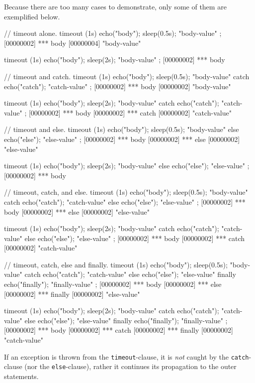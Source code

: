 Because there are too many cases to demonstrate, only some of them are
exemplified below.
\begin{urbiscript}
// timeout alone.
timeout (1s)  { echo("body"); sleep(0.5s); "body-value" };
[00000002] *** body
[00000004] "body-value"

timeout (1s)  { echo("body"); sleep(2s); "body-value" };
[00000002] *** body

// timeout and catch.
timeout (1s)  { echo("body"); sleep(0.5s); "body-value" }
catch         { echo("catch"); "catch-value" };
[00000002] *** body
[00000002] "body-value"

timeout (1s)  { echo("body"); sleep(2s); "body-value" }
catch         { echo("catch"); "catch-value" };
[00000002] *** body
[00000002] *** catch
[00000002] "catch-value"

// timeout and else.
timeout (1s)  { echo("body"); sleep(0.5s); "body-value" }
else          { echo("else"); "else-value" };
[00000002] *** body
[00000002] *** else
[00000002] "else-value"

timeout (1s)  { echo("body"); sleep(2s); "body-value" }
else          { echo("else"); "else-value" };
[00000002] *** body

// timeout, catch, and else.
timeout (1s)  { echo("body"); sleep(0.5s); "body-value" }
catch         { echo("catch"); "catch-value" }
else          { echo("else"); "else-value" };
[00000002] *** body
[00000002] *** else
[00000002] "else-value"

timeout (1s)  { echo("body"); sleep(2s); "body-value" }
catch         { echo("catch"); "catch-value" }
else          { echo("else"); "else-value" };
[00000002] *** body
[00000002] *** catch
[00000002] "catch-value"

// timeout, catch, else and finally.
timeout (1s)  { echo("body"); sleep(0.5s); "body-value" }
catch         { echo("catch"); "catch-value" }
else          { echo("else"); "else-value" }
finally       { echo("finally"); "finally-value" };
[00000002] *** body
[00000002] *** else
[00000002] *** finally
[00000002] "else-value"

timeout (1s)  { echo("body"); sleep(2s); "body-value" }
catch         { echo("catch"); "catch-value" }
else          { echo("else"); "else-value" }
finally       { echo("finally"); "finally-value" };
[00000002] *** body
[00000002] *** catch
[00000002] *** finally
[00000002] "catch-value"
\end{urbiscript}

If an exception is thrown from the \lstinline{timeout}-clause, it is
\emph{not} caught by the \lstinline{catch}-clause (nor the
\lstinline{else}-clause), rather it continues its propagation to the outer
statements.

